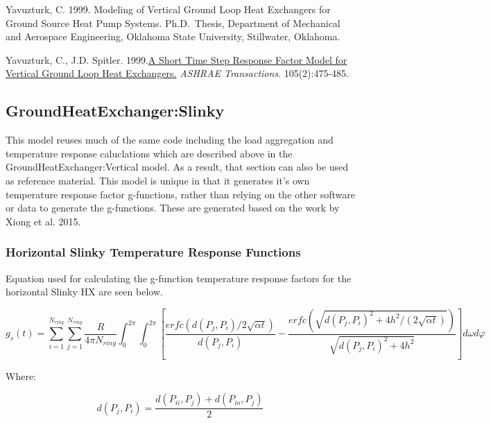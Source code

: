 Yavuzturk, C. 1999. Modeling of Vertical Ground Loop Heat Exchangers for Ground Source Heat Pump Systems. Ph.D.~Thesis, Department of Mechanical and Aerospace Engineering, Oklahoma State University, Stillwater, Oklahoma.

Yavuzturk, C., J.D. Spitler. 1999.\href{http://www.hvac.okstate.edu/research/Documents/ASHRAE/Yavuzturk_Spitler_99.pdf}{A Short Time Step Response Factor Model for Vertical Ground Loop Heat Exchangers.} \emph{ASHRAE Transactions}. 105(2):475-485.

\subsection{GroundHeatExchanger:Slinky}\label{groundheatexchangerslinky}

This model reuses much of the same code including the load aggregation and temperature response caluclations which are described above in the GroundHeatExchanger:Vertical model. As a result, that section can also be used as reference material. This model is unique in that it generates it's own temperature response factor g-functions, rather than relying on the other software or data to generate the g-functions. These are generated based on the work by Xiong et al. 2015.

\subsubsection{Horizontal Slinky Temperature Response Functions}\label{horizontal-slinky-temperature-response-functions}

Equation used for calculating the g-function temperature response factors for the horizontal Slinky HX are seen below.

{\scriptsize
\begin{equation}
g_s\left(t\right) = \sum_{i = 1}^{N_{ring}} \sum_{j = 1}^{N_{ring}} \frac{R}{4\pi N_{ring}} \int_0^{2\pi} \int_0^{2\pi} 
            \left[ 
                \frac{erfc\left(d\left(P_j,P_i\right)/2\sqrt{\alpha t}\right)}{d\left(P_j,P_i\right)} - 
                \frac{erfc\left(\sqrt{d\left(P_j,P_i\right)^2+4h^2/\left(2\sqrt{\alpha t}\right)}\right)}{\sqrt{d\left(P_j,P_i\right)^2+4h^2} }
            \right]d\omega d\varphi
\end{equation}}

Where:

\begin{equation}
d\left(P_j,P_i\right) = \frac{d\left(P_{ii},P_j\right) + d\left(P_{io},P_j\right)}{2}
\end{equation}

